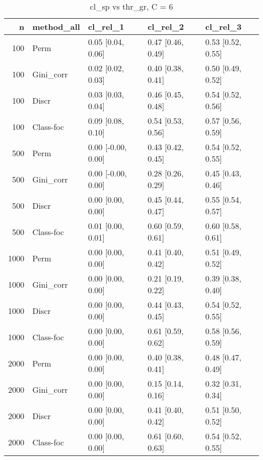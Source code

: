 \begin{table}[ht]
\centering
\caption{cl\_sp vs thr\_gr, C = 6} 
\begin{tabular}{rllll}
  \hline
n & method\_all & cl\_rel\_1 & cl\_rel\_2 & cl\_rel\_3 \\ 
  \hline
100 & Perm & 0.05 [0.04, 0.06] & 0.47 [0.46, 0.49] & 0.53 [0.52, 0.55] \\ 
  100 & Gini\_corr & 0.02 [0.02, 0.03] & 0.40 [0.38, 0.41] & 0.50 [0.49, 0.52] \\ 
  100 & Discr & 0.03 [0.03, 0.04] & 0.46 [0.45, 0.48] & 0.54 [0.52, 0.56] \\ 
  100 & Class-foc & 0.09 [0.08, 0.10] & 0.54 [0.53, 0.56] & 0.57 [0.56, 0.59] \\ 
   \hline 500 & Perm & 0.00 [-0.00, 0.00] & 0.43 [0.42, 0.45] & 0.54 [0.52, 0.55] \\ 
  500 & Gini\_corr & 0.00 [-0.00, 0.00] & 0.28 [0.26, 0.29] & 0.45 [0.43, 0.46] \\ 
  500 & Discr & 0.00 [0.00, 0.00] & 0.45 [0.44, 0.47] & 0.55 [0.54, 0.57] \\ 
  500 & Class-foc & 0.01 [0.00, 0.01] & 0.60 [0.59, 0.61] & 0.60 [0.58, 0.61] \\ 
   \hline 1000 & Perm & 0.00 [0.00, 0.00] & 0.41 [0.40, 0.42] & 0.51 [0.49, 0.52] \\ 
  1000 & Gini\_corr & 0.00 [0.00, 0.00] & 0.21 [0.19, 0.22] & 0.39 [0.38, 0.40] \\ 
  1000 & Discr & 0.00 [0.00, 0.00] & 0.44 [0.43, 0.45] & 0.54 [0.52, 0.55] \\ 
  1000 & Class-foc & 0.00 [0.00, 0.00] & 0.61 [0.59, 0.62] & 0.58 [0.56, 0.59] \\ 
   \hline 2000 & Perm & 0.00 [0.00, 0.00] & 0.40 [0.38, 0.41] & 0.48 [0.47, 0.49] \\ 
  2000 & Gini\_corr & 0.00 [0.00, 0.00] & 0.15 [0.14, 0.16] & 0.32 [0.31, 0.34] \\ 
  2000 & Discr & 0.00 [0.00, 0.00] & 0.41 [0.40, 0.42] & 0.51 [0.50, 0.52] \\ 
  2000 & Class-foc & 0.00 [0.00, 0.00] & 0.61 [0.60, 0.63] & 0.54 [0.52, 0.55] \\ 
   \hline
\end{tabular}
\end{table}
